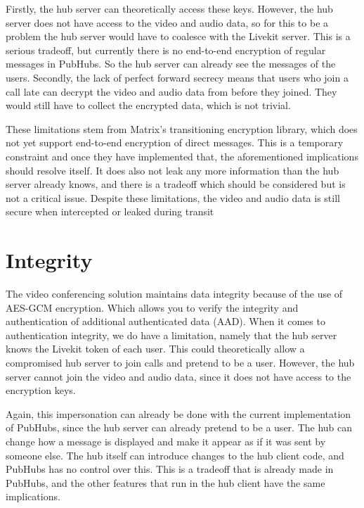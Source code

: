 \documentclass{report}
\begin{document}
Firstly, the hub server can theoretically access these
keys. However, the hub server does not have access to the video and audio data, so for this to be a problem the hub
server would have to coalesce with the Livekit server. This is a serious tradeoff, but currently there is no end-to-end
encryption of regular messages in PubHubs. So the hub server can already see the messages of the users. Secondly,
the lack of perfect forward secrecy means that users who join a call late can decrypt the video and audio data from
before they joined. They would still have to collect the encrypted data, which is not trivial.

These limitations stem from Matrix's transitioning encryption library, which does not yet support end-to-end
encryption of direct messages. This is a temporary constraint and once they have implemented that, the
aforementioned implications should resolve itself. It does also not leak any more information than the hub server
already knows, and there is a tradeoff which should be considered but is not a critical issue. Despite these limitations,
the video and audio data is still secure when intercepted or leaked during transit

\section{Integrity}
The video conferencing solution maintains data integrity because of the use of AES-GCM encryption. Which allows you
to verify the integrity and authentication of additional authenticated data (AAD). When it comes to authentication
integrity, we do have a limitation, namely that the hub server knows the Livekit token of each user. This could
theoretically allow a compromised hub server to join calls and pretend to be a user. However, the hub server cannot
join the video and audio data, since it does not have access to the encryption keys.

Again, this impersonation can already be done with the current implementation of PubHubs, since the hub server can
already pretend to be a user. The hub can change how a message is displayed and make it appear as if it was sent by
someone else. The hub itself can introduce changes to the hub client code, and PubHubs has no control over this.
This is a tradeoff that is already made in PubHubs, and the other features that run in the hub client have the same
implications.
\end{document}
